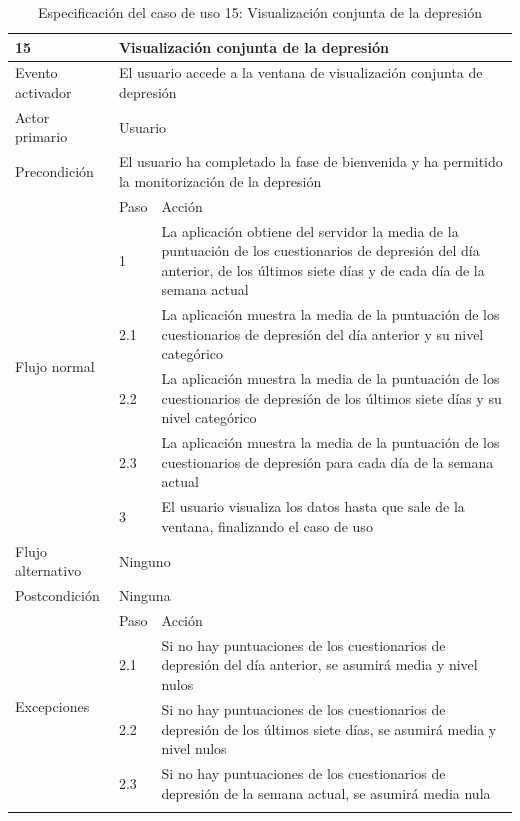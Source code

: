     \begin{table}[h]
        \centering
        \begin{tabularx}{\textwidth}{|l|l|X|}
            \hline
            15 & \multicolumn{2}{|X|}{Visualización conjunta de la depresión} \\
            \hline
            Evento activador & \multicolumn{2}{|X|}{El usuario accede a la ventana de visualización conjunta de depresión} \\
            \hline
            Actor primario & \multicolumn{2}{|X|}{Usuario} \\
            \hline
            Precondición & \multicolumn{2}{|X|}{El usuario ha completado la fase de bienvenida y ha permitido la monitorización de la depresión} \\
            \hline
            \multirow{6}{*}{Flujo normal} & Paso & Acción \\
            \cline{2-3} & 1 & La aplicación obtiene del servidor la media de la puntuación de los cuestionarios de depresión del día anterior, de los últimos siete días y de cada día de la semana actual \\
            \cline{2-3} & 2.1 & La aplicación muestra la media de la puntuación de los cuestionarios de depresión del día anterior y su nivel categórico \\
            \cline{2-3} & 2.2 & La aplicación muestra la media de la puntuación de los cuestionarios de depresión de los últimos siete días y su nivel categórico \\
            \cline{2-3} & 2.3 & La aplicación muestra la media de la puntuación de los cuestionarios de depresión para cada día de la semana actual \\
            \cline{2-3} & 3 & El usuario visualiza los datos hasta que sale de la ventana, finalizando el caso de uso \\
            \hline
            Flujo alternativo & \multicolumn{2}{|X|}{Ninguno} \\
            \hline
            Postcondición & \multicolumn{2}{|X|}{Ninguna} \\
            \hline
            \multirow{4}{*}{Excepciones}  & Paso & Acción \\
            \cline{2-3} & 2.1 & Si no hay puntuaciones de los cuestionarios de depresión del día anterior, se asumirá media y nivel nulos \\
            \cline{2-3} & 2.2 & Si no hay puntuaciones de los cuestionarios de depresión de los últimos siete días, se asumirá media y nivel nulos \\
            \cline{2-3} & 2.3 & Si no hay puntuaciones de los cuestionarios de depresión de la semana actual, se asumirá media nula \\
            \hline
            \caption{Especificación del caso de uso 15: Visualización conjunta de la depresión}
            \label{tabla:casos_uso:visualizacion_conjunta_depresion}
        \end{tabularx}
    \end{table}

